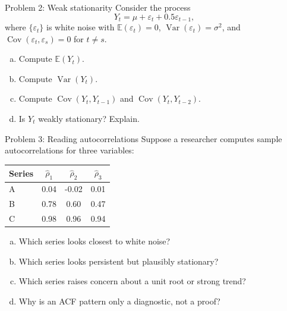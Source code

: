 \documentclass[10pt]{beamer}
\DeclareMathOperator{\Cov}{Cov}
\DeclareMathOperator{\Var}{Var}
\newcommand{\E}{\mathbb{E}}
\newcommand{\eps}{\varepsilon}
\begin{document}
\begin{frame}{Problem 2: Weak stationarity}
\label{q2}
\small
Consider the process
\[
Y_t=\mu+\eps_t+0.5\eps_{t-1},
\]
where $\{\eps_t\}$ is white noise with $\E(\eps_t)=0$, $\Var(\eps_t)=\sigma^2$, and $\Cov(\eps_t,\eps_s)=0$ for $t\neq s$.

\begin{enumerate}[(a)]
  \item Compute $\E(Y_t)$.
  \item Compute $\Var(Y_t)$.
  \item Compute $\Cov(Y_t,Y_{t-1})$ and $\Cov(Y_t,Y_{t-2})$.
  \item Is $Y_t$ weakly stationary? Explain.
\end{enumerate}

\vfill
\hfill\hyperlink{s2}{}
\end{frame}

\begin{frame}{Problem 3: Reading autocorrelations}
\label{q3}
\small
Suppose a researcher computes sample autocorrelations for three variables:

\begin{center}
\begin{tabular}{lccc}
\toprule
Series & $\hat\rho_1$ & $\hat\rho_2$ & $\hat\rho_3$ \\
\midrule
A & 0.04 & -0.02 & 0.01 \\
B & 0.78 & 0.60 & 0.47 \\
C & 0.98 & 0.96 & 0.94 \\
\bottomrule
\end{tabular}
\end{center}

\begin{enumerate}[(a)]
  \item Which series looks closest to white noise?
  \item Which series looks persistent but plausibly stationary?
  \item Which series raises concern about a unit root or strong trend?
  \item Why is an ACF pattern only a diagnostic, not a proof?
\end{enumerate}

\vfill
\hfill\hyperlink{s3}{}
\end{frame}
\end{document}
